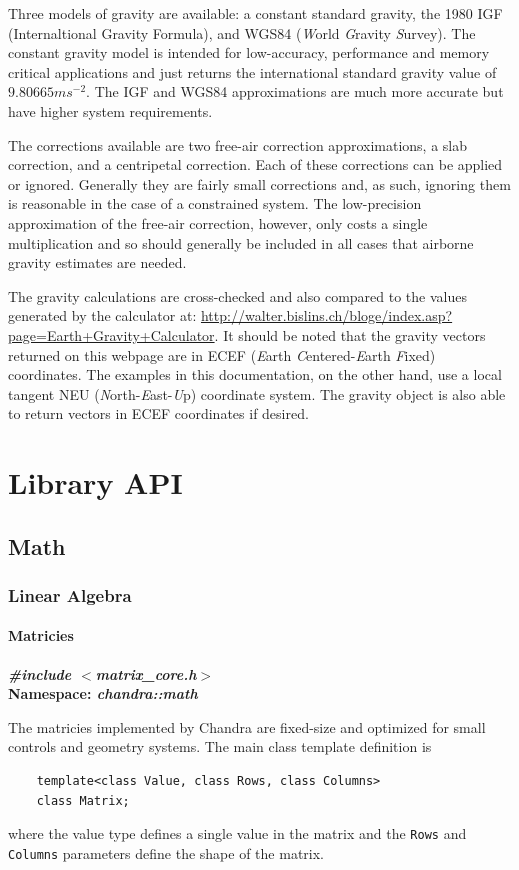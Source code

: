 \documentclass[10pt,letterpaper]{memoir} %
\newcommand{\apiheader}[2]{\noindent{}\textbf{\emph{\#include $<$#1$>$}}\\\noindent{}\textbf{Namespace: \emph{#2}}}
\begin{document}
Three models of gravity are available: a constant standard gravity, the 1980 IGF (Internaltional Gravity Formula), and WGS84 (\emph{W}orld \emph{G}ravity \emph{S}urvey).  The constant gravity model is intended for low-accuracy, performance and memory critical applications and just returns the international standard gravity value of $9.80665 ms^{-2}$.  The IGF and WGS84 approximations are much more accurate but have higher system requirements.

The corrections available are two free-air correction approximations, a slab correction, and a centripetal correction.  Each of these corrections can be applied or ignored.  Generally they are fairly small corrections and, as such, ignoring them is reasonable in the case of a constrained system.  The low-precision approximation of the free-air correction, however, only costs a single multiplication and so should generally be included in all cases that airborne gravity estimates are needed.

The gravity calculations are cross-checked and also compared to the values generated by the calculator at: \url{http://walter.bislins.ch/bloge/index.asp?page=Earth+Gravity+Calculator}.  It should be noted that the gravity vectors returned on this webpage are in ECEF (\emph{E}arth \emph{C}entered-\emph{E}arth \emph{F}ixed) coordinates.  The examples in this documentation, on the other hand, use a local tangent NEU (\emph{N}orth-\emph{E}ast-\emph{U}p) coordinate system.  The gravity object is also able to return vectors in ECEF coordinates if desired.

\part{Library API}
\chapter{Math}
\section{Linear Algebra}
\subsection{Matricies}
\label{sec:math:matricies}
\apiheader{matrix\_core.h}{chandra::math}

The matricies implemented by Chandra are fixed-size and optimized for small controls and geometry systems.  The main class template definition is
\begin{verbatim}
	template<class Value, class Rows, class Columns>
	class Matrix;	
\end{verbatim}
where the value type defines a single value in the matrix and the \texttt{Rows} and \texttt{Columns} parameters define the shape of the matrix.
\end{document}

